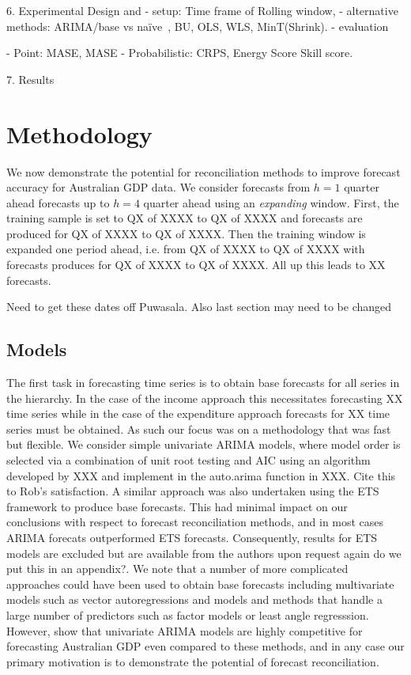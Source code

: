 \documentclass[graybox]{svmult}
\def\naive{na\"{i}ve\ }
\begin{document}
6. Experimental Design and
- setup: Time frame of Rolling window,
- alternative methods: ARIMA/base vs \naive, BU, OLS, WLS, MinT(Shrink).
- evaluation

- Point: MASE, MASE
- Probabilistic: CRPS, Energy Score
Skill score.

7. Results

\section{Methodology}\label{sec:meth}

We now demonstrate the potential for reconciliation methods to improve forecast accuracy for Australian GDP data.  We consider forecasts from $h=1$ quarter ahead forecasts up to $h=4$ quarter ahead using an {\em expanding} window.  First, the training sample is set to QX of XXXX to QX of XXXX and forecasts are produced for QX of XXXX to QX of XXXX. Then the training window is expanded one period ahead, i.e. from QX of XXXX to QX of XXXX with forecasts produces for QX of XXXX to QX of XXXX.  All up this leads to XX forecasts.

{\color{red} Need to get these dates off Puwasala.  Also last section may need to be changed}

\subsection{Models}

The first task in forecasting time series is to obtain base forecasts for all series in the hierarchy.  In the case of the income approach this necessitates forecasting XX time series while in the case of the expenditure approach forecasts for XX time series must be obtained.  As such our focus was on a methodology that was fast but flexible.  We consider simple univariate ARIMA models, where model order is selected via a combination of unit root testing and AIC using an algorithm developed by XXX and implement in the auto.arima function in XXX. {\color{red} Cite this to Rob's satisfaction}.  A similar approach was also undertaken using the ETS framework to produce base forecasts.  This had minimal impact on our conclusions with respect to forecast reconciliation methods, and in most cases ARIMA forecats outperformed ETS forecasts.  Consequently, results for ETS models are excluded but are available from the authors upon request {\color{red} again do we put this in an appendix?}.  We note that a number of more complicated approaches could have been used to obtain base forecasts including multivariate models such as vector autoregressions and models and methods that handle a large number of predictors such as factor models or least angle regresssion.  However, \cite{PanEtAl2019} show that univariate ARIMA models are highly competitive for forecasting Australian GDP even compared to these methods, and in any case our primary motivation is to demonstrate the potential of forecast reconciliation.
\end{document}
